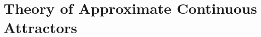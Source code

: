 \documentclass{article} %
\newcounter{ct}
\theoremstyle{definition}
\theoremstyle{remark}
\begin{document}


\section{Theory of Approximate Continuous Attractors}\label{sec:theory}
\end{document}
